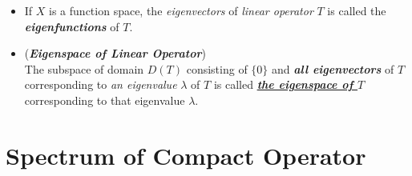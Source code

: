\documentclass[11pt]{article}
\begin{document}
\begin{itemize}
\item \begin{remark}
If $X$ is a function space, the \emph{eigenvectors} of \emph{linear operator} $T$ is called the \emph{\textbf{eigenfunctions}} of $T$.
\end{remark}

\item \begin{definition} (\emph{\textbf{Eigenspace of Linear Operator}})\\
The subspace of domain $D(T)$ consisting of $\{0\}$ and \emph{\textbf{all eigenvectors}} of $T$ corresponding to \emph{an eigenvalue} $\lambda$ of $T$ is
called  \underline{\textbf{\emph{the eigenspace of $T$}}} corresponding to that eigenvalue $\lambda$.
\end{definition}
\end{itemize}


\section{Spectrum of Compact Operator}
\end{document}
